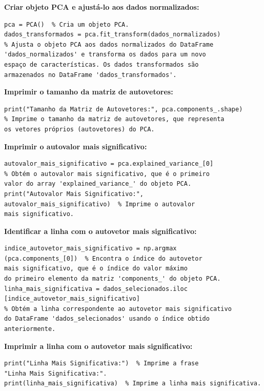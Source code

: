 \documentclass[12pt, a4paper]{article}
\begin{document}
\begin{enumerate}
\textbf{Criar objeto PCA e ajustá-lo aos dados normalizados:}

\begin{verbatim}
pca = PCA()  % Cria um objeto PCA.
dados_transformados = pca.fit_transform(dados_normalizados) 
% Ajusta o objeto PCA aos dados normalizados do DataFrame 
'dados_normalizados' e transforma os dados para um novo 
espaço de características. Os dados transformados são 
armazenados no DataFrame 'dados_transformados'.
\end{verbatim}

\textbf{Imprimir o tamanho da matriz de autovetores:}

\begin{verbatim}
print("Tamanho da Matriz de Autovetores:", pca.components_.shape)  
% Imprime o tamanho da matriz de autovetores, que representa 
os vetores próprios (autovetores) do PCA.
\end{verbatim}

\textbf{Imprimir o autovalor mais significativo:}

\begin{verbatim}
autovalor_mais_significativo = pca.explained_variance_[0]  
% Obtém o autovalor mais significativo, que é o primeiro 
valor do array 'explained_variance_' do objeto PCA.
print("Autovalor Mais Significativo:", 
autovalor_mais_significativo)  % Imprime o autovalor 
mais significativo.
\end{verbatim}

\textbf{Identificar a linha com o autovetor mais significativo:}

\begin{verbatim}
indice_autovetor_mais_significativo = np.argmax
(pca.components_[0])  % Encontra o índice do autovetor 
mais significativo, que é o índice do valor máximo 
do primeiro elemento da matriz 'components_' do objeto PCA.
linha_mais_significativa = dados_selecionados.iloc
[indice_autovetor_mais_significativo] 
% Obtém a linha correspondente ao autovetor mais significativo 
do DataFrame 'dados_selecionados' usando o índice obtido 
anteriormente.
\end{verbatim}

\textbf{Imprimir a linha com o autovetor mais significativo:}

\begin{verbatim}
print("Linha Mais Significativa:")  % Imprime a frase 
"Linha Mais Significativa:".
print(linha_mais_significativa)  % Imprime a linha mais significativa.
\end{verbatim}


\end{enumerate}
\end{document}
